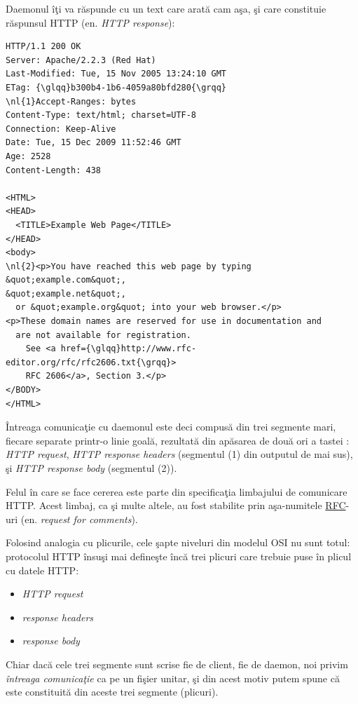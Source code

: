 Daemonul îţi va răspunde cu un text care arată cam aşa, şi care constituie răspunsul
HTTP (en. \textsl{HTTP response}):
\begin{Verbatim}[commandchars=\\\{\}]
HTTP/1.1 200 OK
Server: Apache/2.2.3 (Red Hat)
Last-Modified: Tue, 15 Nov 2005 13:24:10 GMT
ETag: {\glqq}b300b4-1b6-4059a80bfd280{\grqq}            
\nl{1}Accept-Ranges: bytes                        
Content-Type: text/html; charset=UTF-8      
Connection: Keep-Alive                      
Date: Tue, 15 Dec 2009 11:52:46 GMT         
Age: 2528                                   
Content-Length: 438

<HTML>
<HEAD>
  <TITLE>Example Web Page</TITLE>
</HEAD>                          
<body>                           
\nl{2}<p>You have reached this web page by typing &quot;example.com&quot;,
&quot;example.net&quot;,                                            
  or &quot;example.org&quot; into your web browser.</p>             
<p>These domain names are reserved for use in documentation and
  are not available for registration.
	See <a href={\glqq}http://www.rfc-editor.org/rfc/rfc2606.txt{\grqq}>
	RFC 2606</a>, Section 3.</p>        
</BODY>                                                                           
</HTML>
\end{Verbatim}
Întreaga comunicaţie cu daemonul este deci compusă din trei segmente mari, fiecare separate
printr-o linie goală, rezultată din apăsarea de două ori a tastei :
\textsl{HTTP request}, \textsl{HTTP response headers} (segmentul (1) din outputul de mai sus),
şi \textsl{HTTP response body} (segmentul (2)).

Felul în care se face cererea este parte din specificaţia
limbajului de comunicare HTTP. Acest limbaj, ca şi multe altele, au fost stabilite
prin aşa-numitele \href{http://en.wikipedia.org/wiki/Request_for_Comments}{RFC}-uri
(en. \textsl{request for comments}).

Folosind analogia cu plicurile, cele şapte niveluri din modelul OSI nu sunt totul:
protocolul HTTP însuşi mai defineşte încă trei plicuri care trebuie puse în
{\glqq}plicul{\grqq} cu datele HTTP:
\begin{itemize}
\item \textsl{HTTP request}
\item \textsl{response headers}
\item \textsl{response body}
\end{itemize}
Chiar dacă cele trei {\glqq}segmente{\grqq} sunt scrise fie de client, fie de daemon,
noi privim \textit{întreaga comunicaţie} ca pe un fişier unitar, şi din acest motiv
putem spune că este constituită din aceste trei segmente ({\glqq}plicuri{\grqq}).

